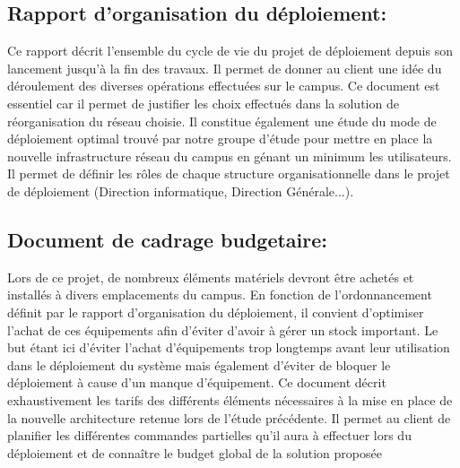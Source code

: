 \subsection{Rapport d'organisation du déploiement:} Ce rapport décrit l'ensemble du cycle de vie du projet de déploiement depuis son lancement jusqu'à la fin des travaux. Il permet de donner au client  une idée du déroulement des diverses opérations effectuées sur le campus. Ce document est essentiel car il permet de justifier les choix effectués dans la solution de réorganisation du réseau choisie. Il constitue également une étude du mode de déploiement optimal trouvé par notre groupe d'étude pour mettre en place la nouvelle infrastructure réseau du campus en génant un minimum les utilisateurs. Il permet de définir les rôles de chaque structure organisationnelle dans le projet de déploiement (Direction informatique, Direction Générale...).

\subsection{Document de cadrage budgetaire:} Lors de ce projet, de nombreux éléments matériels devront être achetés et installés à divers emplacements du campus. En fonction de l'ordonnancement définit par le rapport d'organisation du déploiement, il convient d'optimiser l'achat de ces équipements afin d'éviter d'avoir à gérer un stock important. Le but étant ici d'éviter l'achat d'équipements trop longtemps avant leur utilisation dans le déploiement du système mais également d'éviter de bloquer le déploiement à cause d'un manque d'équipement. Ce document décrit exhaustivement les tarifs des différents éléments nécessaires à la mise en place de la nouvelle architecture retenue lors de l'étude précédente. Il permet au client de planifier les différentes commandes partielles qu'il aura à effectuer lors du déploiement et de connaître le budget global de la solution proposée
